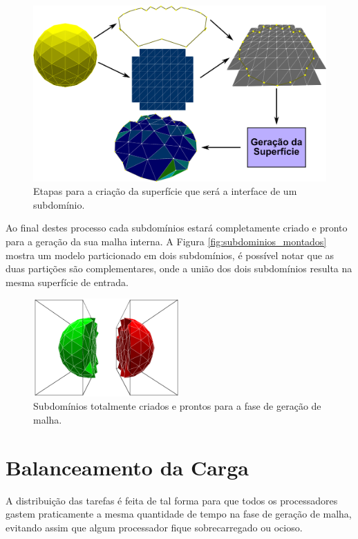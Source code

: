 \begin{figure}[!ht]
	\centering
	\includegraphics[width=1.0\textwidth]{fig/geracao_tridimensional.png}
	\caption{Etapas para a criação da superfície que será a interface de um subdomínio.}
	\label{fig:geracao_tridimensional}
\end{figure}

Ao final destes processo cada subdomínios estará completamente criado e pronto para a geração da sua malha interna. A Figura \ref{fig:subdominios_montados} mostra um modelo particionado em dois subdomínios, é possível notar que as duas partições são complementares, onde a união dos dois subdomínios resulta na mesma superfície de entrada.

\begin{figure}[!ht]
	\centering
	\includegraphics[width=0.5\textwidth]{fig/subdominios3D_montados.png}
	\caption{Subdomínios totalmente criados e prontos para a fase de geração de malha.}
	\label{fig:subdominios3D_montados}
\end{figure}


\section{Balanceamento da Carga}
\label{sec:Balanceamento_de_Carga}


A distribuição das tarefas é feita de tal forma para que todos os processadores gastem praticamente a mesma quantidade de tempo na fase de geração de malha, evitando assim que algum processador fique sobrecarregado ou ocioso.

